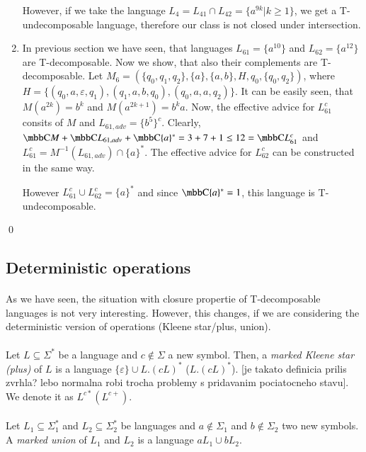 \begin{enumerate}
However, if we take the language $L_4 = L_{41} \cap L_{42} = \{ a^{9k} | k \geq 1 \}$, we get a T-undecomposable language, therefore our class is not closed under intersection.

\item In previous section we have seen, that languages $L_{61} = \{a^{10}\}$ and $L_{62}=\{a^{12}\}$ are T-decomposable. Now we show, that also their complements are T-decomposable. Let $M_6 =(\{q_0,q_1,q_2\}, \{a\},\{a,b\},H,q_0,\{q_0,q_2\})$, where $H = \{(q_0,a,\varepsilon,q_1),\allowbreak (q_1,a,b,q_0),\allowbreak (q_0,a,a,q_2)\}$. It can be easily seen, that $M(a^{2k}) = b^k$ and $M(a^{2k+1}) = b^ka$. Now, the effective advice for $L_{61}^c$ consits of $M$ and $L_{61,adv} = \{b^5\}^c$. Clearly, $\C{M} + \C{L_{61,adv}} + \C{\{a\}^*} = 3+7+1 \leq 12 = \C{L_{61}^c}$ and $L_{61}^c = M^{-1}(L_{61,adv}) \cap \{a\}^*$. The effective advice for $L_{62}^c$ can be constructed in the same way.

However $L_{61}^c \cup L_{62}^c = \{a\}^*$ and since $\C{\{a\}^*} = 1$, this language is T-undecomposable.
\end{enumerate} \qed

\subsection{Deterministic operations}
\paragraph{}
As we have seen, the situation with closure propertie of T-decomposable languages is not very interesting. However, this changes, if we are considering the deterministic version of operations (Kleene star/plus, union).

\paragraph{}
 Let $L \subseteq \Sigma^*$ be a language and $c \notin \Sigma$ a new symbol. Then, a \emph{marked Kleene star (plus)} of $L$ is a language $\{ \varepsilon \} \cup L.(cL)^*$ ($L.(cL)^*$). \color{red}[je takato definicia prilis zvrhla? lebo normalna robi trocha problemy s pridavanim pociatocneho stavu]\color{black}. We denote it as $L^{c*} (L^{c+})$.

\paragraph{}
 Let $L_1 \subseteq \Sigma_1^*$ and $L_2 \subseteq \Sigma_2^*$ be languages and $a \notin \Sigma_1$ and $b \notin \Sigma_2$ two new symbols. A \emph{marked union} of $L_1$ and $L_2$ is a language $aL_1 \cup bL_2$.

